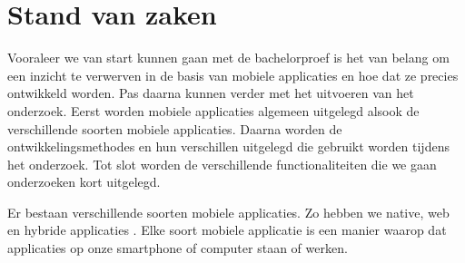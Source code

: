 \chapter{Stand van zaken}
\label{ch:stand-van-zaken}




Vooraleer we van start kunnen gaan met de bachelorproef is het van belang om een inzicht te 
verwerven in de basis van mobiele applicaties en hoe dat ze precies ontwikkeld worden. 
Pas daarna kunnen verder met het uitvoeren van het onderzoek. Eerst worden mobiele applicaties 
algemeen uitgelegd alsook de verschillende soorten mobiele applicaties. 
Daarna worden de ontwikkelingsmethodes en hun verschillen uitgelegd die gebruikt worden tijdens het 
onderzoek. Tot slot worden de verschillende functionaliteiten die we gaan onderzoeken kort uitgelegd.


Er bestaan verschillende soorten mobiele applicaties. Zo hebben we native, web en hybride 
applicaties \autocite{AWS2023}. Elke soort mobiele applicatie is een manier waarop dat 
applicaties op onze smartphone of computer staan of werken.

